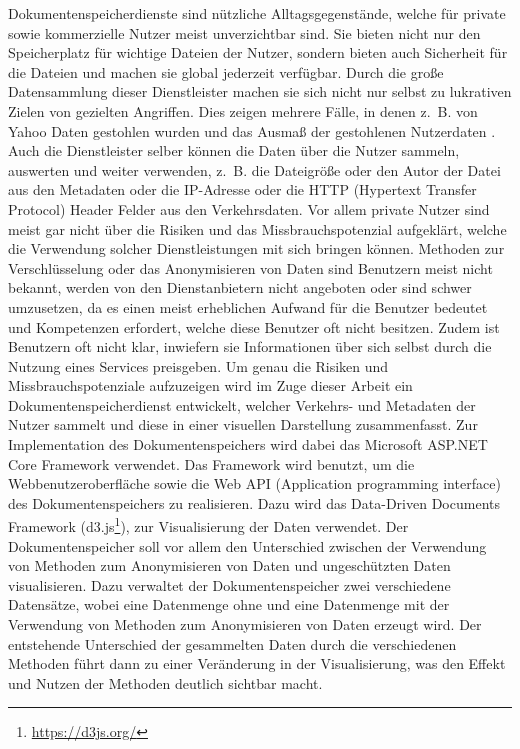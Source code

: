 \documentclass[
    fontsize=12pt,
    headings=small,
    parskip=half,           %
    bibliography=totoc,
    numbers=noenddot,       %
    open=any,               %
    ]{scrreprt}
\begin{document}
Dokumentenspeicherdienste sind nützliche Alltagsgegenstände, welche für private sowie kommerzielle Nutzer meist unverzichtbar sind. 
Sie bieten nicht nur den Speicherplatz für wichtige Dateien der Nutzer, sondern bieten auch Sicherheit für die Dateien und machen sie global jederzeit verfügbar. 
Durch die große Datensammlung dieser Dienstleister machen sie sich nicht nur selbst zu lukrativen Zielen von gezielten Angriffen.
Dies zeigen mehrere Fälle, in denen z.~B. von Yahoo Daten gestohlen wurden und das Ausmaß der gestohlenen Nutzerdaten \cite{Yaho17}. 
Auch die Dienstleister selber können die Daten über die Nutzer sammeln, auswerten und weiter verwenden, z.~B. die Dateigröße oder den Autor der Datei aus den Metadaten oder die IP-Adresse oder die HTTP (Hypertext Transfer Protocol) Header Felder \cite{HTTP} aus den Verkehrsdaten.
Vor allem private Nutzer sind meist gar nicht über die Risiken und das Missbrauchspotenzial aufgeklärt, welche die Verwendung solcher Dienstleistungen mit sich bringen können. 
Methoden zur Verschlüsselung oder das Anonymisieren von Daten sind Benutzern meist nicht bekannt, werden von den Dienstanbietern nicht angeboten oder sind schwer umzusetzen, da es einen meist erheblichen Aufwand für die Benutzer bedeutet und Kompetenzen erfordert, welche diese Benutzer oft nicht besitzen. 
Zudem ist Benutzern oft nicht klar, inwiefern sie Informationen über sich selbst durch die Nutzung eines Services preisgeben.
Um genau die Risiken und Missbrauchspotenziale aufzuzeigen wird im Zuge dieser Arbeit ein Dokumentenspeicherdienst entwickelt, welcher Verkehrs- und Metadaten der Nutzer sammelt und diese in einer visuellen Darstellung zusammenfasst. 
Zur Implementation des Dokumentenspeichers wird dabei das Microsoft ASP.NET Core Framework verwendet. 
Das Framework wird benutzt, um die Webbenutzeroberfläche sowie die Web API (Application programming interface) des Dokumentenspeichers zu realisieren. 
Dazu wird das Data-Driven Documents Framework (d3.js\footnote{\url{https://d3js.org/}}), zur Visualisierung der Daten verwendet. 
Der Dokumentenspeicher soll vor allem den Unterschied zwischen der Verwendung von Methoden zum Anonymisieren von Daten und ungeschützten Daten visualisieren.
Dazu verwaltet der Dokumentenspeicher zwei verschiedene Datensätze, wobei eine Datenmenge ohne und eine Datenmenge mit der Verwendung von Methoden zum Anonymisieren von Daten erzeugt wird. 
Der entstehende Unterschied der gesammelten Daten durch die verschiedenen Methoden führt dann zu einer Veränderung in der Visualisierung, was den Effekt und Nutzen der Methoden deutlich sichtbar macht. 
 
\end{document}
